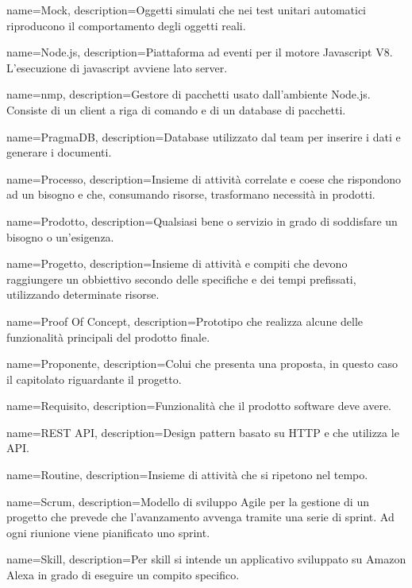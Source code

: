 {
	name={Mock},
	description={Oggetti simulati che nei test unitari automatici riproducono il comportamento degli oggetti reali.}
}

{
name={Node.js},
description={Piattaforma ad eventi per il motore Javascript V8. L’esecuzione di javascript avviene lato server.}
}

{
	name={nmp},
	description={Gestore di pacchetti usato dall'ambiente Node.js.
	Consiste di un client a riga di comando e di un database di pacchetti.}
}

{
	name={PragmaDB},
	description={Database utilizzato dal team per inserire i dati e generare i documenti.}
}

{
name={Processo},
description={Insieme di attività correlate e coese che rispondono ad un bisogno e che, consumando risorse, trasformano necessità in prodotti.}
}

{
name={Prodotto},
description={Qualsiasi bene o servizio in grado di soddisfare un bisogno o un’esigenza.}
}

{
name={Progetto},
description={Insieme di attività e compiti che devono raggiungere un obbiettivo secondo delle specifiche e dei tempi prefissati, utilizzando determinate risorse.}
}

{
	name={Proof Of Concept},
	description={Prototipo che realizza alcune delle funzionalità principali del prodotto finale.}
}

{
name={Proponente},
description={Colui che presenta una proposta, in questo caso il capitolato riguardante il progetto.}
}

{
name={Requisito},
description={Funzionalità che il prodotto software deve avere.}
}

{
	name={REST API},
	description={Design pattern basato su HTTP e che utilizza le API.}
}


{
name={Routine},
description={Insieme di attività che si ripetono nel tempo.}
}

{
name={Scrum},
description={Modello di sviluppo Agile per la gestione di un progetto che prevede che l’avanzamento avvenga tramite una serie di sprint. Ad ogni riunione viene pianificato uno sprint.}
}

{
name={Skill},
description={Per skill si intende un applicativo sviluppato su Amazon Alexa in grado di eseguire un compito specifico.}
}


